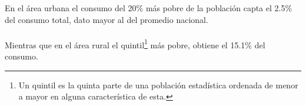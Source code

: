 En el área urbana el consumo del 20\% más pobre de la población    capta  el 2.5\% del consumo total, dato mayor al del promedio nacional.
\\\\ 
Mientras que en el área rural el quintil\footnote{Un quintil es la quinta parte de una población estadística ordenada de menor a mayor en alguna característica de esta.} más pobre, obtiene el 15.1\% del consumo.